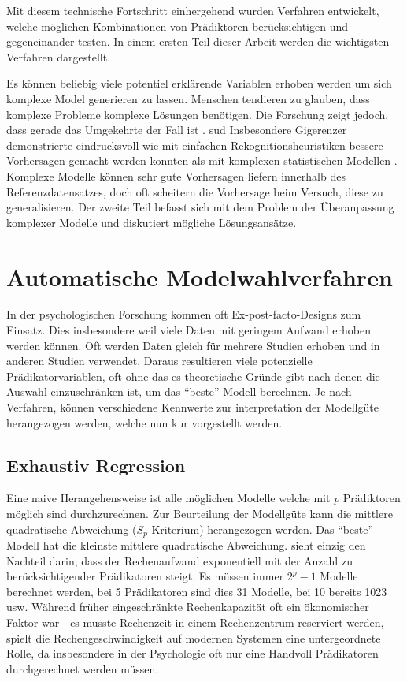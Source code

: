\documentclass[english,12pt,doc]{apa}
\begin{document}
Mit diesem technische Fortschritt einhergehend wurden Verfahren entwickelt, welche möglichen Kombinationen von Prädiktoren berücksichtigen und gegeneinander testen. In einem ersten Teil dieser Arbeit werden die wichtigsten Verfahren dargestellt. 

Es können beliebig viele potentiel erklärende Variablen erhoben werden um sich komplexe Model generieren zu lassen. Menschen tendieren zu glauben, dass komplexe Probleme komplexe Lösungen benötigen. Die Forschung zeigt jedoch, dass gerade das Umgekehrte der Fall ist \cite[p.3]{armstrong2011illusions}. sud
Insbesondere Gigerenzer demonstrierte eindrucksvoll wie mit einfachen Rekognitionsheuristiken bessere Vorhersagen gemacht werden konnten als mit komplexen statistischen Modellen \cite{borges1999can}. Komplexe Modelle können sehr gute Vorhersagen liefern innerhalb des Referenzdatensatzes, doch oft scheitern die Vorhersage beim Versuch, diese zu generalisieren. Der zweite Teil befasst sich mit dem Problem der Überanpassung komplexer Modelle und diskutiert mögliche Lösungsansätze.

\section{Automatische Modelwahlverfahren}
In der psychologischen Forschung kommen oft Ex-post-facto-Designs zum Einsatz. Dies insbesondere weil viele Daten mit geringem Aufwand erhoben werden können. Oft werden  Daten gleich für mehrere Studien erhoben und in anderen Studien verwendet. Daraus resultieren viele potenzielle Prädikatorvariablen, oft ohne das es theoretische Gründe gibt nach denen die Auswahl einzuschränken ist, um das ``beste'' Modell berechnen. Je nach Verfahren, können verschiedene Kennwerte zur interpretation der Modellgüte herangezogen werden, welche nun kur vorgestellt werden.

\subsection{Exhaustiv Regression} 
Eine naive Herangehensweise ist alle möglichen Modelle welche mit $p$ Prädiktoren möglich sind durchzurechnen. Zur Beurteilung der Modellgüte kann die mittlere quadratische Abweichung ($S_p$-Kriterium) herangezogen werden. Das ``beste'' Modell hat die kleinste mittlere quadratische Abweichung.  sieht einzig den Nachteil darin, dass der Rechenaufwand exponentiell mit der Anzahl zu berücksichtigender Prädikatoren steigt. Es müssen immer $2^p-1$ Modelle berechnet werden, bei 5 Prädikatoren sind dies 31 Modelle, bei 10 bereits 1023 usw. Während früher eingeschränkte Rechenkapazität oft ein ökonomischer Faktor war - es musste Rechenzeit in einem Rechenzentrum reserviert werden, spielt die Rechengeschwindigkeit auf modernen Systemen eine untergeordnete Rolle, da insbesondere in der Psychologie oft nur eine Handvoll Prädikatoren durchgerechnet werden müssen.
\end{document}
